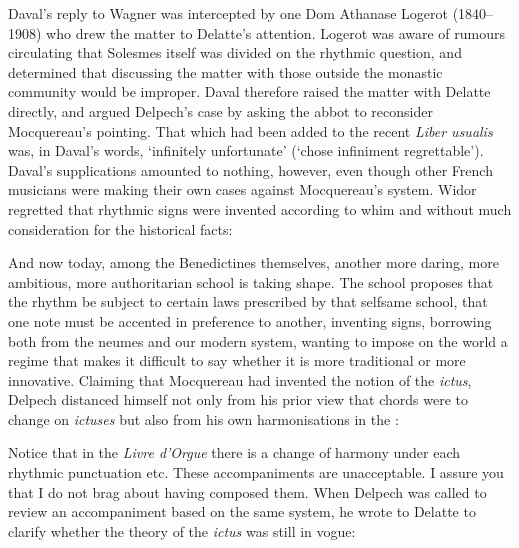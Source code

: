 %
\noindent
Daval's reply to Wagner was intercepted by one Dom Athanase Logerot (1840--1908) who drew the matter to Delatte's attention.
Logerot was aware of rumours circulating that Solesmes itself was divided on the rhythmic question, and determined that discussing the matter with those outside the monastic community would be improper.
Daval therefore raised the matter with Delatte directly, and argued Delpech's case by asking the abbot to reconsider Mocquereau's pointing.
That which had been added to the recent \emph{Liber usualis} was, in Daval's words, `infinitely unfortunate' (`chose infiniment regrettable').
Daval's supplications amounted to nothing, however, even though other French musicians were making their own cases against Mocquereau's system.
Widor regretted that rhythmic signs were invented according to whim and without much consideration for the historical facts:

  {\cite[58]{Widorrevisionplainchant1904}}
{And now today, among the Benedictines themselves, another more daring, more ambitious, more authoritarian school is taking shape. The school proposes that the rhythm be subject to certain laws prescribed by that selfsame school, that one note must be accented in preference to another, inventing signs, borrowing both from the neumes and our modern system, wanting to impose on the world a regime that makes it difficult to say whether it is more traditional or more innovative.}
\noindent
Claiming that Mocquereau had invented the notion of the \emph{ictus}, Delpech distanced himself not only from his prior view that chords were to change on \emph{ictuses} but also from his own harmonisations in the \ldo{}:

  {}
{Notice that in the \emph{Livre d'Orgue} there is a change of harmony under each rhythmic punctuation etc. These accompaniments are unacceptable. I assure you that I do not brag about having composed them.}
\noindent
When Delpech was called to review an accompaniment based on the same system, he wrote to Delatte to clarify whether the theory of the \emph{ictus} was still in vogue:

